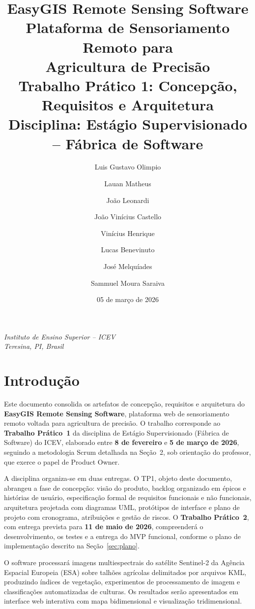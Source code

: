 \documentclass[12pt, a4paper]{article}
\title{%
  \vspace{-1cm}
  \textbf{\Large EasyGIS Remote Sensing Software}\\[6pt]
  \large Plataforma de Sensoriamento Remoto para\\Agricultura de Precisão\\[12pt]
  \normalsize Trabalho Prático 1: Concepção, Requisitos e Arquitetura\\[4pt]
  \normalsize Disciplina: Estágio Supervisionado -- Fábrica de Software
}
\author{%
  Luis Gustavo Olimpio \and Lauan Matheus \and João Leonardi\\
  \and João Vinícius Castello \and Vinícius Henrique\\
  \and Lucas Benevinuto \and José Melquíades \and Sammuel Moura Saraiva
}
\date{05 de março de 2026}
\begin{document}
\maketitle
\thispagestyle{empty}

\vfill
\begin{center}
\small\textit{Instituto de Ensino Superior -- ICEV}\\
\small\textit{Teresina, PI, Brasil}
\end{center}
\newpage

\tableofcontents
\newpage

\section{Introdução}

Este documento consolida os artefatos de concepção, requisitos e arquitetura do \textbf{EasyGIS Remote Sensing Software}, plataforma web de sensoriamento remoto voltada para agricultura de precisão. O trabalho corresponde ao \textbf{Trabalho Prático~1} da disciplina de Estágio Supervisionado (Fábrica de Software) do ICEV, elaborado entre \textbf{8 de fevereiro} e \textbf{5 de março de 2026}, seguindo a metodologia Scrum detalhada na Seção~2, sob orientação do professor, que exerce o papel de Product Owner.

A disciplina organiza-se em duas entregas. O TP1, objeto deste documento, abrangeu a fase de concepção: visão do produto, backlog organizado em épicos e histórias de usuário, especificação formal de requisitos funcionais e não funcionais, arquitetura projetada com diagramas UML, protótipos de interface e plano de projeto com cronograma, atribuições e gestão de riscos. O \textbf{Trabalho Prático~2}, com entrega prevista para \textbf{11 de maio de 2026}, compreenderá o desenvolvimento, os testes e a entrega do MVP funcional, conforme o plano de implementação descrito na Seção~\ref{sec:plano}.

O software processará imagens multiespectrais do satélite Sentinel-2 da Agência Espacial Europeia (ESA) sobre talhões agrícolas delimitados por arquivos KML, produzindo índices de vegetação, experimentos de processamento de imagem e classificações automatizadas de culturas. Os resultados serão apresentados em interface web interativa com mapa bidimensional e visualização tridimensional.

\end{document}
